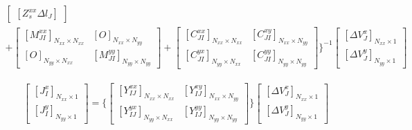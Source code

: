 \documentclass[
	12pt,				%
	openright,			%
	oneside,			%
	a4paper,			%
	english,			%
	brazil				%
	]{abntex2}
\begin{document}
\begin{apendicesenv}
\begin{equation}
\begin{aligned}
\begin{bmatrix}[Z_s^{xx}\Delta l_J]
   \end{bmatrix} 
   \\+
   \begin{bmatrix}[M_{JI}^{xx}]_{N_{xx}\times N_{xx}}& [O]_{N_{xx}\times N_{yy}}\\
   [O]_{N_{yy}\times N_{xx}}&[M_{JI}^{yy}]_{N_{yy}\times N_{yy}}
   \end{bmatrix}+
   \begin{bmatrix}[C_{JI}^{xx}]_{N_{xx}\times N_{xx}}& [C_{JI}^{xy}]_{N_{xx}\times N_{yy}}\\
   [C_{JI}^{yx}]_{N_{yy}\times N_{xx}}&[C_{JI}^{yy}]_{N_{yy}\times N_{yy}}
   \end{bmatrix} \Biggl\}^{-1}
\begin{bmatrix}[\Delta V^{x}_J]_{N_{xx}\times 1} \\ [\Delta V^{y}_J]_{N_{yy}\times 1}\end{bmatrix}
   \end{aligned}
\end{equation}

\begin{equation}
\begin{aligned}
  \begin{bmatrix} [J^{x}_I]_{N_{xx}\times 1} \\ [J^{y}_I]_{N_{yy}\times 1}\end{bmatrix}  =\Biggl\{
   \begin{bmatrix}[Y_{IJ}^{xx}]_{N_{xx}\times N_{xx}}& [Y_{IJ}^{xy}]_{N_{xx}\times N_{yy}}\\
   [Y_{IJ}^{yx}]_{N_{yy}\times N_{xx}}&[Y_{IJ}^{yy}]_{N_{yy}\times N_{yy}}
   \end{bmatrix} \Biggl\}
\begin{bmatrix}[\Delta V^{x}_J]_{N_{xx}\times 1} \\ [\Delta V^{y}_J]_{N_{yy}\times 1}\end{bmatrix}
   \end{aligned}
\end{equation}



\end{apendicesenv}


\end{document}
